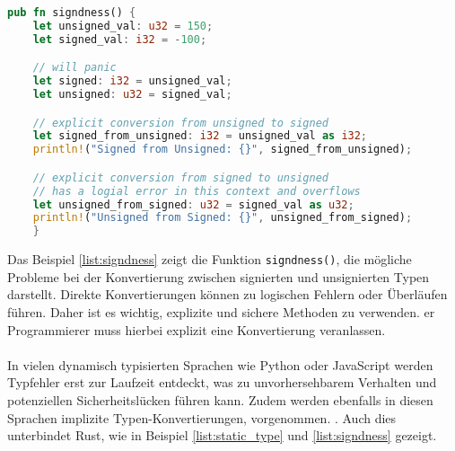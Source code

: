 \begin{lstlisting}[language=Rust, caption={Signiertheit}, label=list:signdness]
pub fn signdness() {
    let unsigned_val: u32 = 150;
    let signed_val: i32 = -100;

    // will panic 
    let signed: i32 = unsigned_val;
    let unsigned: u32 = signed_val;

    // explicit conversion from unsigned to signed
    let signed_from_unsigned: i32 = unsigned_val as i32;
    println!("Signed from Unsigned: {}", signed_from_unsigned);

    // explicit conversion from signed to unsigned
    // has a logial error in this context and overflows
    let unsigned_from_signed: u32 = signed_val as u32;
    println!("Unsigned from Signed: {}", unsigned_from_signed); 
    }
\end{lstlisting}
\noindent
Das Beispiel \ref{list:signdness} zeigt die Funktion \texttt{signdness()}, die mögliche Probleme bei der Konvertierung zwischen signierten und unsignierten Typen darstellt. 
Direkte Konvertierungen können zu logischen Fehlern oder Überläufen führen. 
Daher ist es wichtig, explizite und sichere Methoden zu verwenden. 
er Programmierer muss hierbei explizit eine Konvertierung veranlassen.\\
\\
In vielen dynamisch typisierten Sprachen wie Python oder JavaScript werden Typfehler erst zur Laufzeit entdeckt, was zu unvorhersehbarem Verhalten und potenziellen Sicherheitslücken führen kann. 
Zudem werden ebenfalls in diesen Sprachen implizite Typen-Konvertierungen, vorgenommen. \cite[Kapitel 1: Types]{drysdale2024}.
Auch dies unterbindet Rust, wie in Beispiel \ref{list:static_type} und \ref{list:signdness} gezeigt.
